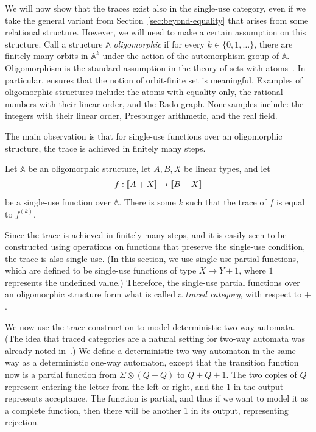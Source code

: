 \documentclass[10pt,a4paper]{amsart}
\numberwithin{equation}{section}
\theoremstyle{plain}
\newcommand{\set}[1]{\{#1\}}
\newcommand{\sem}[1]{[{\kern-0.45ex}[#1]{\kern-0.45ex}]}
\newcommand{\atoms}{\mathbb A}
\begin{document}
We will now show that the traces exist also in the single-use category, even if we take the general variant from Section~\ref{sec:beyond-equality} that arises from some relational structure. However, we will need to make a certain assumption on this structure. Call a structure $\atoms$  \emph{oligomorphic} if for every $k \in \set{0,1,\ldots}$, there  are finitely many orbits in $\atoms^k$ under the action of the automorphism group of $\atoms$.
Oligomorphism is the standard assumption in the theory of sets with atoms~\cite{bojanczyk_slightly2018}. In particular, ensures that the notion of orbit-finite set is meaningful. Examples of oligomorphic structures include: the atoms with equality only, the rational numbers with their linear order, and the Rado graph. Nonexamples include: the integers with their linear order, Presburger arithmetic, and the real field. 



The main observation is that for single-use functions over an oligomorphic structure, the trace is achieved in finitely many steps.
\begin{lemma}\label{lem:traced-finite-iteration} Let $\atoms$ be an oligomorphic structure, let $A,B,X$ be linear types, and let 
    \begin{align*}
        f : \sem{A + X} \to \sem{B + X}
        \end{align*}
        be a single-use function over $\atoms$. There is some $k$ such that the trace of $f$ is equal to $f^{(k)}$.
\end{lemma}


Since the trace is achieved in finitely many steps, and it is easily seen to be constructed using operations on functions that preserve the single-use condition, the trace is also single-use. (In this section, we use single-use partial functions, which are defined to be single-use functions of type $X \to Y +1$, where $1$ represents the undefined value.) Therefore, the single-use partial functions over an oligomorphic structure form what is called a \emph{traced category}, with respect to $+$. 



We now use the trace construction to model deterministic two-way automata. (The idea that traced categories are a natural setting for two-way automata was already noted in~\cite{hines2003categorical}.) We define a deterministic two-way automaton in the same way as a deterministic one-way automaton, except that the transition function now is a partial function from $\Sigma \otimes (Q + Q)$ to $Q + Q + 1$. 
The two copies of $Q$ represent entering the letter from the left or right, and the $1$ in the output represents acceptance.  The function is partial, and thus if we want to model it as a complete function, then there will be another $1$ in its output, representing rejection.
\end{document}
